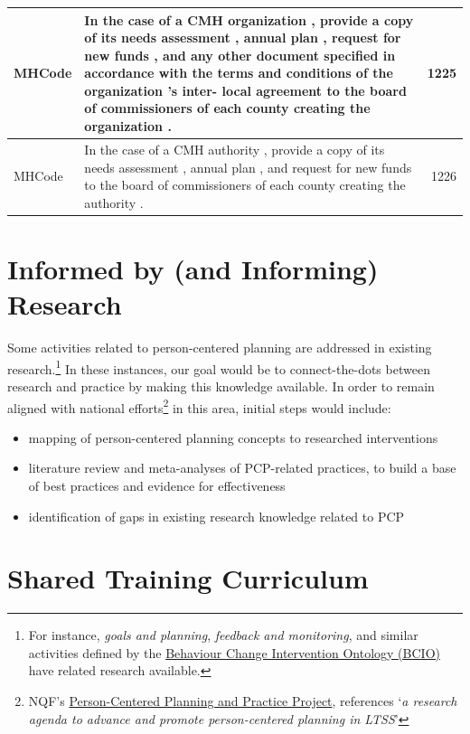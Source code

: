 \documentclass[
]{book}
\providecommand{\tightlist}{%
  \setlength{\itemsep}{0pt}\setlength{\parskip}{0pt}}
\begin{document}
\begin{tabular}{l|l|r}
\hline
MHCode & In the case of a CMH organization , provide a copy of its needs assessment , annual plan , request for new funds , and any other document specified in accordance with the terms and conditions of the organization 's inter- local agreement to the board of commissioners of each county creating the organization . & 1225\\
\hline
MHCode & In the case of a CMH authority , provide a copy of its needs assessment , annual plan , and request for new funds to the board of commissioners of each county creating the authority . & 1226\\
\hline
\end{tabular}

\hypertarget{research}{%
\chapter{Informed by (and Informing) Research}\label{research}}

Some activities related to person-centered planning are addressed in existing research.\footnote{For instance, \emph{goals and planning}, \emph{feedback and monitoring}, and similar activities defined by the \href{https://www.humanbehaviourchange.org/resources/behavioural-science/25/description}{Behaviour Change Intervention Ontology (BCIO)} have related research available.} In these instances, our goal would be to connect-the-dots between research and practice by making this knowledge available. In order to remain aligned with national efforts\footnote{NQF's \href{http://www.qualityforum.org/WorkArea/linkit.aspx?LinkIdentifier=id\&ItemID=91382}{Person-Centered Planning and Practice Project}, references `\emph{a research agenda to advance and promote person-centered planning in LTSS}'} in this area, initial steps would include:

\begin{itemize}
\tightlist
\item
  mapping of person-centered planning concepts to researched interventions
\item
  literature review and meta-analyses of PCP-related practices, to build a base of best practices and evidence for effectiveness
\item
  identification of gaps in existing research knowledge related to PCP
\end{itemize}

\hypertarget{curriculum}{%
\chapter{Shared Training Curriculum}\label{curriculum}}
\end{document}
